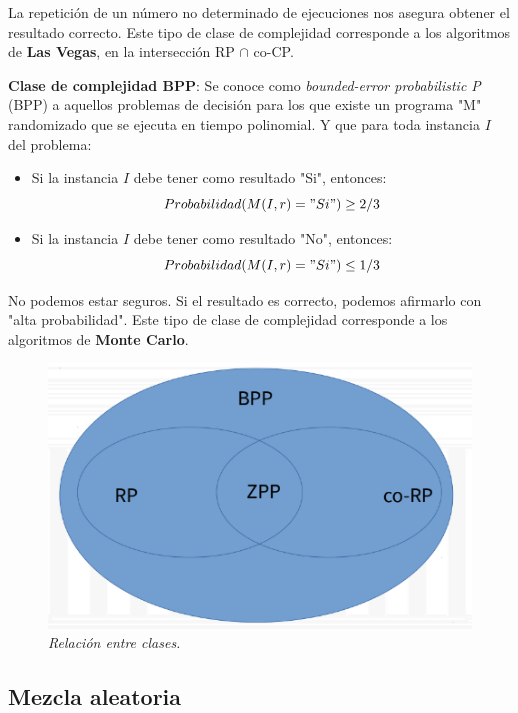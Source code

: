 \documentclass{article}
\begin{document}
La repetición de un número no determinado de ejecuciones nos asegura obtener el resultado correcto.
Este tipo de clase de complejidad corresponde a los algoritmos de \textbf{Las Vegas}, en la intersección RP \(\cap\) co-CP.


\textbf{Clase de complejidad BPP}: Se conoce como \textit{bounded-error probabilistic P} (BPP) a aquellos problemas de decisión
para los que existe un programa "M" randomizado que se ejecuta en tiempo polinomial. Y que para 
toda instancia \(I\) del problema:
\begin{itemize}
    \item Si la instancia \(I\) debe tener como resultado "Si", entonces:
     \[
         Probabilidad(M(I,r)="Si") \geq 2/3
     \] 
    \item Si la instancia \(I\) debe tener como resultado "No", entonces:
    \[
        Probabilidad(M(I,r)="Si") \leq 1/3
    \]
\end{itemize}

No podemos estar seguros. Si el resultado es correcto, podemos afirmarlo con "alta probabilidad".
Este tipo de clase de complejidad corresponde a los algoritmos de \textbf{Monte Carlo}.

\begin{figure}[h!]
    \begin{center} 
    \includegraphics[scale=0.3]{imagenes/relacion-rp-p-zpp-bpp.png}
    \caption{\small \sl Relación entre clases.\label{fig:hamilton-ej}} 
    \end{center}
\end{figure}

\newpage
\subsection{Mezcla aleatoria}
\end{document}
